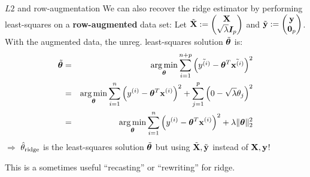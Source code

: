 \documentclass[11pt,compress,t,notes=noshow, xcolor=table]{beamer}
\begin{document}
\begin{vbframe}{$L2$ and row-augmentation}
We can also recover the ridge estimator by performing least-squares on a \textbf{row-augmented} data set: Let $\tilde{\mathbf{X}}:= \begin{pmatrix} \mathbf{X} \\ \sqrt{\lambda} \bm{I}_{p} \end{pmatrix}$ and $\tilde{\mathbf{y}} := \begin{pmatrix}
    \mathbf{y} \\ \bm{0}_{p}
\end{pmatrix}$. \\
With the augmented data, the unreg. least-squares solution $\tilde{\bm{\theta}}$ is:
{\small
\begin{eqnarray*}
\tilde{\thetav} &=& \argmin_{\thetav} 
\sum_{i=1}^{n+p} \left(\tilde{\yi} - \thetav^T \tilde{\xi} \right)^2 \\ &=& \argmin_{\thetav} 
\sum_{i=1}^{n} \left(\yi - \thetav^T \xi \right)^2 + \sum_{j=1}^{p} \left(0 - \sqrt{\lambda} \theta_j \right)^2 \\ %
&=& \argmin_{\thetav} \sumin \left(\yi - \thetav^T \xi \right)^2 + \lambda \|\thetav\|_2^2
\end{eqnarray*}
}
$\Longrightarrow$ $\hat{\theta}_{\text{ridge}}$ is the least-squares solution $\tilde{\bm{\theta}}$ but using $\tilde{\mathbf{X}},\tilde{\mathbf{y}}$ instead of $\mathbf{X}, \mathbf{y}$!\\

\lz

This is a sometimes useful ``recasting'' or ``rewriting'' for ridge.
\end{vbframe}
\end{document}
